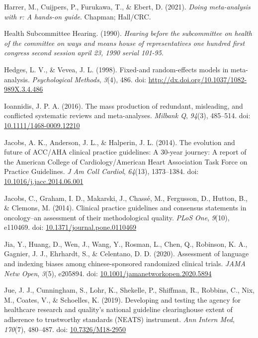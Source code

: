 \documentclass[
  letterpaper,
  DIV=11,
  numbers=noendperiod]{scrreprt}
\newlength{\cslhangindent}
\newlength{\cslentryspacingunit} %
\newenvironment{CSLReferences}[2] %
 {%
  \setlength{\parindent}{0pt}
  \ifodd #1
  \let\oldpar\par
  \def\par{\hangindent=\cslhangindent\oldpar}
  \fi
  \setlength{\parskip}{#2\cslentryspacingunit}
 }%
 {}
\begin{document}
\begin{CSLReferences}{1}{0}
\leavevmode{}%
Harrer, M., Cuijpers, P., Furukawa, T., \& Ebert, D. (2021). \emph{Doing
meta-analysis with r: A hands-on guide}. Chapman; Hall/CRC.

\leavevmode{}%
Health Subcommittee Hearing. (1990). \emph{Hearing before the
subcommittee on health of the committee on ways and means house of
representatives one hundred first congress second session april 23, 1990
serial 101-95}.

\leavevmode{}%
Hedges, L. V., \& Vevea, J. L. (1998). Fixed-and random-effects models
in meta-analysis. \emph{Psychological Methods}, \emph{3}(4), 486. doi:
\url{http://dx.doi.org/10.1037/1082-989X.3.4.486}

\leavevmode{}%
Ioannidis, J. P. A. (2016). The mass production of redundant,
misleading, and conflicted systematic reviews and meta-analyses.
\emph{Milbank Q}, \emph{94}(3), 485--514. doi:
\href{https://doi.org/10.1111/1468-0009.12210}{10.1111/1468-0009.12210}

\leavevmode{}%
Jacobs, A. K., Anderson, J. L., \& Halperin, J. L. (2014). The evolution
and future of {ACC/AHA} clinical practice guidelines: A 30-year journey:
A report of the {American College of Cardiology/American Heart
Association Task Force on Practice Guidelines}. \emph{J Am Coll
Cardiol}, \emph{64}(13), 1373--1384. doi:
\href{https://doi.org/10.1016/j.jacc.2014.06.001}{10.1016/j.jacc.2014.06.001}

\leavevmode{}%
Jacobs, C., Graham, I. D., Makarski, J., Chassé, M., Fergusson, D.,
Hutton, B., \& Clemons, M. (2014). Clinical practice guidelines and
consensus statements in oncology--an assessment of their methodological
quality. \emph{PLoS One}, \emph{9}(10), e110469. doi:
\href{https://doi.org/10.1371/journal.pone.0110469}{10.1371/journal.pone.0110469}

\leavevmode{}%
Jia, Y., Huang, D., Wen, J., Wang, Y., Rosman, L., Chen, Q., Robinson,
K. A., Gagnier, J. J., Ehrhardt, S., \& Celentano, D. D. (2020).
Assessment of language and indexing biases among chinese-sponsored
randomized clinical trials. \emph{JAMA Netw Open}, \emph{3}(5), e205894.
doi:
\href{https://doi.org/10.1001/jamanetworkopen.2020.5894}{10.1001/jamanetworkopen.2020.5894}

\leavevmode{}%
Jue, J. J., Cunningham, S., Lohr, K., Shekelle, P., Shiffman, R.,
Robbins, C., Nix, M., Coates, V., \& Schoelles, K. (2019). Developing
and testing the agency for healthcare research and quality's national
guideline clearinghouse extent of adherence to trustworthy standards
(NEATS) instrument. \emph{Ann Intern Med}, \emph{170}(7), 480--487. doi:
\href{https://doi.org/10.7326/M18-2950}{10.7326/M18-2950}


\end{CSLReferences}
\end{document}

